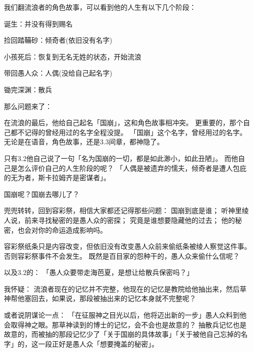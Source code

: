 \dividearticles
{}
\begin{multicols}{2}
	我们翻流浪者的角色故事，可以看到他的人生有以下几个阶段：

	诞生：并没有得到赐名


	捡回踏鞴砂：倾奇者(依旧没有名字)


	小孩死后：恢复到无名无姓的状态，开始流浪


	带回愚人众：人偶(没给自己起名字)


	锄完深渊：散兵


	那么问题来了：


	在流浪的最后，他给自己起名「国崩」，这和角色故事相冲突。
	更重要的，那个自己都不记得的曾经用过的名字全程没提。
	「国崩」这个名字，曾经用过的名字。无论是在语音，角色故事，还是3.3间章，都神隐了。

	只有3.2他自己说了一句「名为国崩的一切，都是如此渺小，如此丑陋」。
	而他自己是怎么评价自己的人生阶段的呢？
	「人偶是被遗弃的懦夫，倾奇者是遭人包庇的无为者，斯卡拉姆齐是密谋者」。

	国崩呢？国崩去哪儿了？

	兜兜转转，回到容彩祭，相信大家都还记得那些问题：
	国崩到底是谁；
	听神里绫人说，前来寻找秘密的是愚人众的密探；
	究竟是谁想要隐藏他的过去；
	他的秘密，也会对你的命运造成影响吗。

	容彩祭纸条只是内容改变，但依旧没有改变愚人众前来偷纸条被绫人察觉这件事。否则容彩祭事件不会发生。
	既然是百目家的怨种干的，愚人众来偷什么信呢？

	以及3.2的：
	「愚人众要带走海芭夏，是想让给散兵保密吗？」

	我怀疑：
	流浪者现在的记忆并不完整，他现在的记忆是教院给他抽出来，然后草神帮他塞回去，如果说，那段被抽出来的记忆本身就不完整呢？

	或者说阴谋论一点：
	「在征服神之目光以后，他将迈出新的一步」愚人众料到他会取得神之眼。那草神读到的博士的记忆，会不会也是故意的？
	抽散兵记忆也是故意的，而被抽的那段记忆少了「关于国崩的具体故事」「关于被他自己忘掉的名字」的，这一段正好是愚人众「想要掩盖的秘密」。


\end{multicols}
